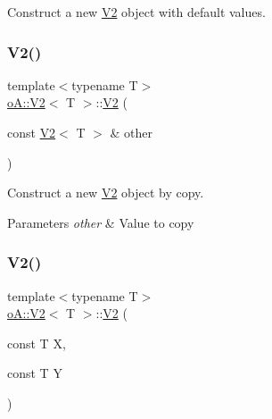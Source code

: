 Construct a new \mbox{\hyperlink{structo_a_1_1_v2}{V2}} object with default values. 

\mbox{\label{structo_a_1_1_v2_adb120ae33b44a00dd2b40136283422eb}} 
\subsubsection{\texorpdfstring{V2()}{V2()}\hspace{0.1cm}{\footnotesize\ttfamily [2/3]}}
{\footnotesize\ttfamily template$<$typename T$>$ \\
\mbox{\hyperlink{structo_a_1_1_v2}{o\+A\+::\+V2}}$<$ T $>$\+::\mbox{\hyperlink{structo_a_1_1_v2}{V2}} (\begin{DoxyParamCaption}\item[{const \mbox{\hyperlink{structo_a_1_1_v2}{V2}}$<$ T $>$ \&}]{other }\end{DoxyParamCaption})\hspace{0.3cm}{\ttfamily [inline]}}



Construct a new \mbox{\hyperlink{structo_a_1_1_v2}{V2}} object by copy. 


\begin{DoxyParams}{Parameters}
{\em other} & Value to copy \\
\hline
\end{DoxyParams}
\mbox{\label{structo_a_1_1_v2_a382c0ae0124a0dd755ce870f40651a41}} 
\subsubsection{\texorpdfstring{V2()}{V2()}\hspace{0.1cm}{\footnotesize\ttfamily [3/3]}}
{\footnotesize\ttfamily template$<$typename T$>$ \\
\mbox{\hyperlink{structo_a_1_1_v2}{o\+A\+::\+V2}}$<$ T $>$\+::\mbox{\hyperlink{structo_a_1_1_v2}{V2}} (\begin{DoxyParamCaption}\item[{const T}]{X,  }\item[{const T}]{Y }\end{DoxyParamCaption})\hspace{0.3cm}{\ttfamily [inline]}}



